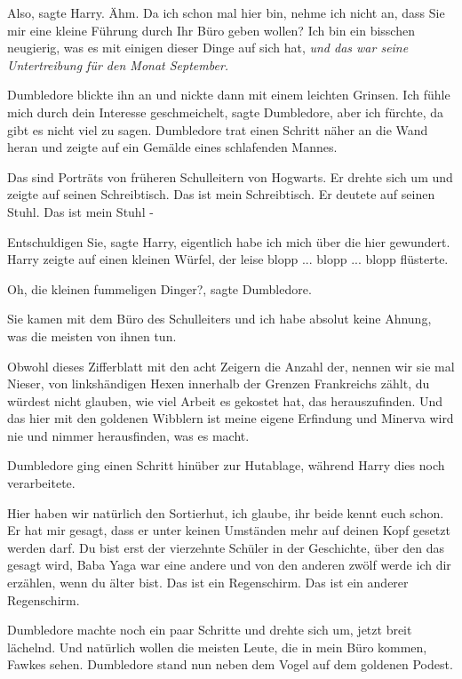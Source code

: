 \glqq{}Also\grqq{}, sagte Harry. \glqq{}Ähm. Da ich schon mal hier bin, nehme ich
nicht an, dass Sie mir eine kleine Führung durch Ihr Büro geben wollen? Ich bin
ein bisschen neugierig, was es mit einigen dieser Dinge auf sich hat\grqq{},
\emph{und das war seine Untertreibung für den Monat September.}

Dumbledore blickte ihn an und nickte dann mit einem leichten Grinsen. \glqq{}Ich
fühle mich durch dein Interesse geschmeichelt\grqq{}, sagte Dumbledore, \glqq{}
aber ich fürchte, da gibt es nicht viel zu sagen.\grqq{} Dumbledore trat einen
Schritt näher an die Wand heran und zeigte auf ein Gemälde eines schlafenden
Mannes.

\glqq{}Das sind Porträts von früheren Schulleitern von Hogwarts.\grqq{} Er drehte
sich um und zeigte auf seinen Schreibtisch. \glqq{}Das ist mein
Schreibtisch.\grqq{} Er deutete auf seinen Stuhl. \glqq{}Das ist mein Stuhl
-\grqq{}

\glqq{}Entschuldigen Sie\grqq{}, sagte Harry, \glqq{}eigentlich habe ich mich über
die hier gewundert.\grqq{} Harry zeigte auf einen kleinen Würfel, der leise
\glqq{}blopp ... blopp ... blopp\grqq{} flüsterte.

\glqq{}Oh, die kleinen fummeligen Dinger?\grqq{}, sagte Dumbledore.

\glqq{}Sie kamen mit dem Büro des Schulleiters und ich habe absolut keine Ahnung,
was die meisten von ihnen tun.

Obwohl dieses Zifferblatt mit den acht Zeigern die Anzahl der, nennen wir sie
mal Nieser, von linkshändigen Hexen innerhalb der Grenzen Frankreichs zählt, du
würdest nicht glauben, wie viel Arbeit es gekostet hat, das herauszufinden. Und
das hier mit den goldenen Wibblern ist meine eigene Erfindung und Minerva wird
nie und nimmer herausfinden, was es macht.\grqq{}

Dumbledore ging einen Schritt hinüber zur Hutablage, während Harry dies noch
verarbeitete.

\glqq{}Hier haben wir natürlich den Sortierhut, ich glaube, ihr beide kennt euch
schon. Er hat mir gesagt, dass er unter keinen Umständen mehr auf deinen Kopf
gesetzt werden darf. Du bist erst der vierzehnte Schüler in der Geschichte, über
den das gesagt wird, Baba Yaga war eine andere und von den anderen zwölf werde
ich dir erzählen, wenn du älter bist. Das ist ein Regenschirm. Das ist ein
anderer Regenschirm.\grqq{}

Dumbledore machte noch ein paar Schritte und drehte sich um, jetzt breit
lächelnd. \glqq{}Und natürlich wollen die meisten Leute, die in mein Büro kommen,
Fawkes sehen.\grqq{} Dumbledore stand nun neben dem Vogel auf dem goldenen
Podest.

